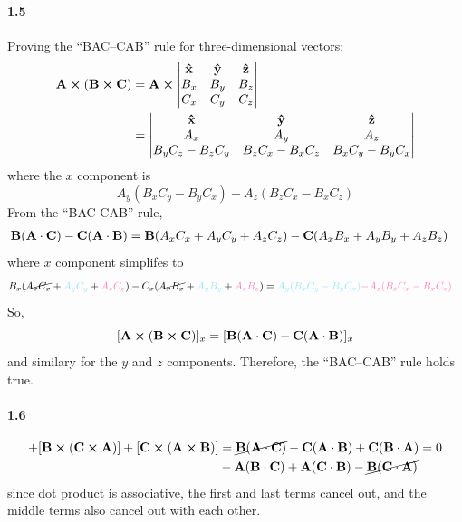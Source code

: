 \documentclass[../main.tex]{subfiles}
\begin{document}
\paragraph{1.5}
Proving the ``BAC--CAB'' rule for three-dimensional vectors:
\begin{align*}
    \vb{A} \cp (\vb{B} \cp \vb{C}) &= \vb{A} \cp
    \begin{vmatrix}
        \vu{x} & \vu{y} & \vu{z} \\
        B_x & B_y & B_z \\
        C_x & C_y & C_z
    \end{vmatrix} \\
    &= \begin{vmatrix}
        \vu{x} & \vu{y} & \vu{z} \\
        A_x & A_y & A_z \\
        B_y C_z - B_z C_y & B_z C_x - B_x C_z & B_x C_y - B_y C_x
    \end{vmatrix}
\end{align*}
where the $x$ component is 
\[A_y (B_x C_y - B_y C_x) - A_z (B_z C_x - B_x C_z)\]
From the ``BAC-CAB'' rule,
\begin{align*}
    \vb{B}(\vb{A} \cdot \vb{C}) - \vb{C}(\vb{A} \cdot \vb{B}) &=
        \vb{B} (A_x C_x + A_y C_y + A_z C_z) - \vb{C} (A_x B_x + A_y B_y + A_z B_z)
\end{align*}
where $x$ component simplifes to
\begin{align*}
    B_x (\cancel{A_x C_x} + \textcolor{draculacyan}{A_y C_y} + \textcolor{draculapink}{A_z C_z}) 
        - C_x (\cancel{A_x B_x}+ \textcolor{draculacyan}{A_y B_y} + \textcolor{draculapink}{A_z B_z}) &=
        \textcolor{draculacyan}{A_y (B_x C_y - B_y C_x)} \textcolor{draculapink}{- A_z (B_z C_x - B_x C_z)}
\end{align*}
So,
\[[\vb A \cross (\vb B \cross \vb C)]_x = [\vb B(\vb A \cdot \vb C) - \vb C ( \vb A \cdot \vb B)]_x\]
and similary for the $y$ and $z$ components. Therefore, the ``BAC--CAB'' rule holds true.

\paragraph{1.6}
\begin{align*}
    [\vb{A} \cp (\vb{B} \cp \vb{C})] + [\vb{B} \cp (\vb{C} \cp \vb{A})] 
        + [\vb{C} \cp (\vb{A} \cp \vb{B})]
    &= \cancel{\vb{B}(\vb{A} \cdot \vb{C})} - \vb{C}(\vb{A} \cdot \vb{B})
    + \vb{C}(\vb{B} \cdot \vb{A}) = 0 \\ &- \vb{A}(\vb{B} \cdot \vb{C})
    + \vb{A}(\vb{C} \cdot \vb{B}) - \cancel{\vb{B}(\vb{C} \cdot \vb{A})}\\
\end{align*}
since dot product is associative, the first and last terms cancel out, and the middle terms also
cancel out with each other.
\end{document}

